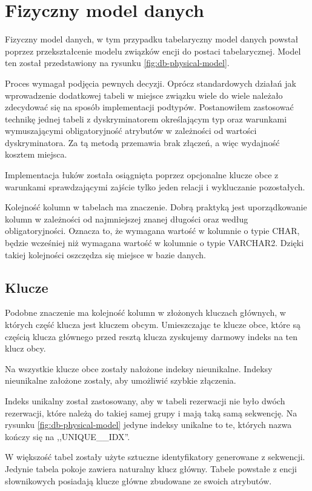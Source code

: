 \documentclass[a4paper,onecolumn,oneside,11pt,wide,floatssmall]{mwrep}
\theoremstyle{definition}
\theoremstyle{plain}%
\theoremstyle{remark}
\begin{document}
\section{Fizyczny model danych}
Fizyczny model danych, w tym przypadku tabelaryczny model danych powstał poprzez przekształcenie modelu związków encji do postaci tabelarycznej. Model ten został przedstawiony na rysunku \ref{fig:db-physical-model}.

Proces wymagał podjęcia pewnych decyzji. Oprócz standardowych działań jak wprowadzenie dodatkowej tabeli w miejsce związku wiele do wiele należało zdecydować się na sposób implementacji podtypów. Postanowiłem zastosować technikę jednej tabeli z dyskryminatorem określającym typ oraz warunkami wymuszającymi obligatoryjność atrybutów w zależności od wartości dyskryminatora. Za tą metodą przemawia brak złączeń, a więc wydajność kosztem miejsca.

Implementacja łuków została osiągnięta poprzez opcjonalne klucze obce z warunkami sprawdzającymi zajście tylko jeden relacji i wykluczanie pozostałych.

Kolejność kolumn w tabelach ma znaczenie. Dobrą praktyką jest uporządkowanie kolumn w zależności od najmniejszej znanej długości oraz według obligatoryjności. Oznacza to, że wymagana wartość w kolumnie o typie CHAR, będzie wcześniej niż wymagana wartość w kolumnie o typie VARCHAR2. Dzięki takiej kolejności oszczędza się miejsce w bazie danych.

\subsection{Klucze}
Podobne znaczenie ma kolejność kolumn w złożonych kluczach głównych, w których część klucza jest kluczem obcym. Umieszczając te klucze obce, które są częścią klucza głównego przed resztą klucza zyskujemy darmowy indeks na ten klucz obcy.

Na wszystkie klucze obce zostały nałożone indeksy nieunikalne. Indeksy nieunikalne założone zostały, aby umożliwić szybkie złączenia. 

Indeks unikalny został zastosowany, aby w tabeli rezerwacji nie było dwóch rezerwacji, które należą do takiej samej grupy i mają taką samą sekwencję. Na rysunku \ref{fig:db-physical-model} jedyne indeksy unikalne to te, których nazwa kończy się na ,,UNIQUE\_\_IDX''.

W większość tabel zostały użyte sztuczne identyfikatory generowane z sekwencji. Jedynie tabela pokoje zawiera naturalny klucz główny. Tabele powstałe z encji słownikowych posiadają klucze główne zbudowane ze swoich atrybutów.
\end{document}
